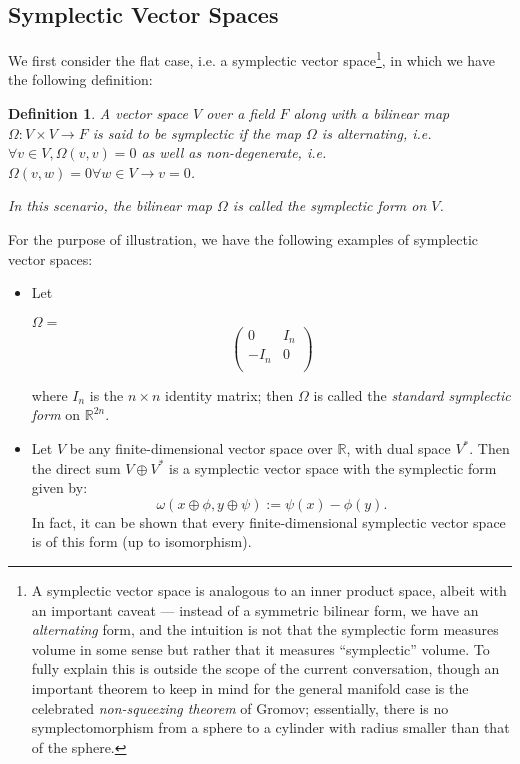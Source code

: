 \documentclass{tufte-handout}
\newtheorem{defn}{Definition}
\begin{document}
\subsection{Symplectic Vector Spaces}
We first consider the flat case, i.e. a symplectic vector space\footnote{A symplectic vector space is analogous to an inner product space, albeit with an important caveat --- instead of a symmetric bilinear form, we have an \emph{alternating} form, and the intuition is not that the symplectic form measures volume in some sense but rather that it measures ``symplectic'' volume. To fully explain this is outside the scope of the current conversation, though an important theorem to keep in mind for the general manifold case is the celebrated \emph{non-squeezing theorem} of Gromov; essentially, there is no symplectomorphism from a sphere to a cylinder with radius smaller than that of the sphere.}, in which we have the following definition:
\begin{defn}
A vector space $V$ over a field $F$ along with a bilinear map $\Omega: V \times V \to F$ is said to be \emph{symplectic} if the map $\Omega$ is \emph{alternating}, i.e. $\forall v \in V, \Omega(v,v) = 0$ as well as \emph{non-degenerate}, i.e. $\Omega(v,w) = 0 \forall w \in V \rightarrow v = 0$.

In this scenario, the bilinear map $\Omega$ is called the \emph{symplectic form} on $V$.
\end{defn}

For the purpose of illustration, we have the following examples of symplectic vector spaces:
\begin{itemize}
\item Let 

$\Omega =$ \[ \left(
\begin{array}{cc}
0    & I_n \\
-I_n & 0   \\
\end{array} \right)\]

where $I_n$ is the $n \times n$ identity matrix; then $\Omega$ is called the \emph{standard symplectic form} on $\mathbb{R}^{2n}$.

\item Let $V$ be any finite-dimensional vector space over $\mathbb{R}$, with dual space $V^*$. Then the direct sum $V \oplus V^*$ is a symplectic vector space with the symplectic form given by:
$$
\omega(x \oplus \phi, y \oplus \psi) := \psi(x) - \phi(y).
$$
In fact, it can be shown that every finite-dimensional symplectic vector space is of this form (up to isomorphism).
\end{itemize}
\end{document}
